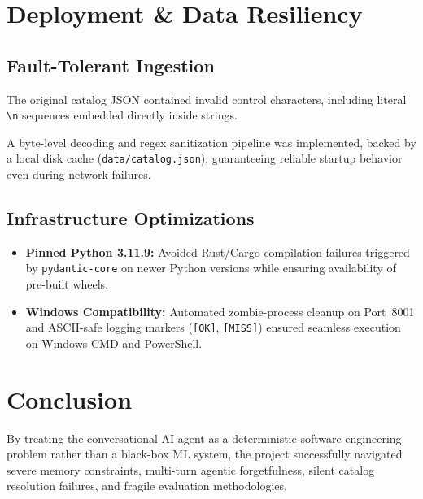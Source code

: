 \documentclass[10pt,twocolumn,letterpaper]{article}
\begin{document}

\section{Deployment \& Data Resiliency}

\subsection{Fault-Tolerant Ingestion}

The original catalog JSON contained invalid control characters,
including literal \texttt{\textbackslash n} sequences embedded directly
inside strings.

A byte-level decoding and regex sanitization pipeline was implemented,
backed by a local disk cache
(\texttt{data/catalog.json}),
guaranteeing reliable startup behavior even during network failures.

\subsection{Infrastructure Optimizations}

\begin{itemize}

\item \textbf{Pinned Python 3.11.9:}
Avoided Rust/Cargo compilation failures triggered by
\texttt{pydantic-core} on newer Python versions while ensuring
availability of pre-built wheels.

\item \textbf{Windows Compatibility:}
Automated zombie-process cleanup on Port~8001 and ASCII-safe logging
markers (\texttt{[OK]}, \texttt{[MISS]}) ensured seamless execution on
Windows CMD and PowerShell.

\end{itemize}


\section{Conclusion}

By treating the conversational AI agent as a deterministic software
engineering problem rather than a black-box ML system, the project
successfully navigated severe memory constraints, multi-turn agentic
forgetfulness, silent catalog resolution failures, and fragile
evaluation methodologies.
\end{document}

